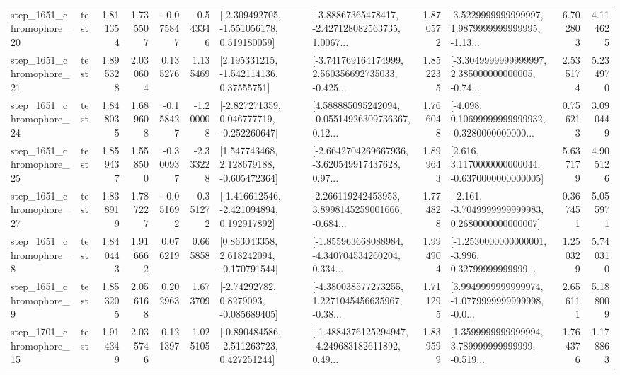 \begin{tabular}{llrrrrllrlrr}
 step\_1651\_chromophore\_20 &      test &      1.811354 &    1.735507 &     -0.075847 & -0.543346 &   [-2.309492705, -1.551056178, 0.519180059] &  [-3.88867365478417, -2.427128082563735, 1.0067... &       1.870572 &  [3.5229999999999997, 1.9879999999999995, -1.13... &            6.702803 &          4.114625 \\
 step\_1651\_chromophore\_21 &      test &      1.895328 &    2.030604 &      0.135276 &  1.135469 &     [2.195331215, -1.542114136, 0.37555751] &  [-3.741769164174999, 2.560356692735033, -0.425... &       1.852235 &  [-3.3049999999999997, 2.385000000000005, -0.74... &            2.535174 &          5.234970 \\
 step\_1651\_chromophore\_24 &      test &      1.848035 &    1.689608 &     -0.158427 & -1.200008 &   [-2.827271359, 0.046777719, -0.252260647] &  [4.588885095242094, -0.05514926309736367, 0.12... &       1.766048 &  [-4.098, 0.10699999999999932, -0.3280000000000... &            0.756213 &          3.090449 \\
 step\_1651\_chromophore\_25 &      test &      1.859437 &    1.558500 &     -0.300937 & -2.333228 &    [1.547743468, 2.128679188, -0.605472364] &  [-2.6642704269667936, -3.620549917437628, 0.97... &       1.899643 &   [2.616, 3.1170000000000044, -0.6370000000000005] &            5.637179 &          4.905126 \\
 step\_1651\_chromophore\_27 &      test &      1.838919 &    1.787227 &     -0.051692 & -0.351272 &   [-1.416612546, -2.421094894, 0.192917892] &  [2.266119242453953, 3.8998145259001666, -0.684... &       1.774828 &  [-2.161, -3.7049999999999983, 0.2680000000000007] &            0.367451 &          5.055971 \\
  step\_1651\_chromophore\_8 &      test &      1.840443 &    1.916662 &      0.076219 &  0.665858 &    [0.863043358, 2.618242094, -0.170791544] &  [-1.855963668088984, -4.340704534260204, 0.334... &       1.994904 &  [-1.2530000000000001, -3.996, 0.32799999999999... &            1.250329 &          5.740310 \\
  step\_1651\_chromophore\_9 &      test &      1.853205 &    2.056168 &      0.202963 &  1.673709 &      [-2.74292782, 0.8279093, -0.085689405] &  [-4.380038577273255, 1.2271045456635967, -0.38... &       1.711295 &  [3.9949999999999974, -1.0779999999999998, -0.0... &            2.656111 &          5.188009 \\
 step\_1701\_chromophore\_15 &      test &      1.914349 &    2.035746 &      0.121397 &  1.025105 &   [-0.890484586, -2.511263723, 0.427251244] &  [-1.4884376125294947, -4.249683182611892, 0.49... &       1.839599 &  [1.3599999999999994, 3.789999999999999, -0.519... &            1.764376 &          1.178863 \\

\end{tabular}
